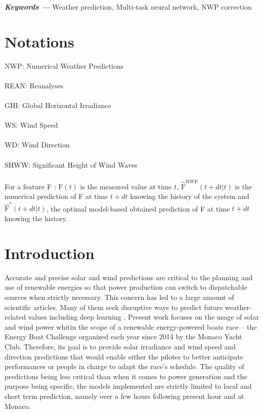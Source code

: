\documentclass{article}
\providecommand{\keywords}[1]{\textbf{\textit{Keywords ---}} #1}
\newcommand{\saut}{\vspace{10px}}
\begin{document}
\saut

\keywords{Weather prediction, Multi-task neural network, NWP correction}

\section*{Notations}

NWP: Numerical Weather Predictions\\
\\
REAN: Reanalyses\\
\\
GHI: Global Horizontal Irradiance\\
\\
WS: Wind Speed\\
\\
WD: Wind Direction\\
\\
SHWW: Significant Height of Wind Waves\\
\\
For a feature F : $\mathrm F (t)$ is the measured value at time $t$, $\hat{\mathrm F}^\mathrm{NWP} (t + dt | t)$ is
the numerical prediction of F at time $t + dt$ knowing the history of the system
and $\hat{\mathrm F}^* (t + dt | t)$, the optimal model-based obtained prediction of F at time $t + dt$ knowing the history.

\section{Introduction}

Accurate and precise solar and wind predictions are critical to the planning and use of renewable energies so that
power production can switch to dispatchable sources when strictly necessary. This concern has led to a large amount of
scientific articles. Many of them seek disruptive ways to predict future weather-related values including deep learning
\cite{zhong_multi-view_2021}.
Present work focuses on the usage of solar and wind power whitin the scope of a renewable energy-powered boats race
-- the Energy Boat Challenge organized each year since 2014 by the Monaco Yacht Club. Therefore, its goal is to provide
solar irradiance and wind speed and direction predictions that would enable either the pilotes to better anticipate
performances or people in charge to adapt the race's schedule. The quality of predictions being less critical than
when it comes to power generation and the purpose being specific, the models implemented are strictly limited to
local and short term prediction, namely over a few hours following present hour and at Monaco.
\end{document}
